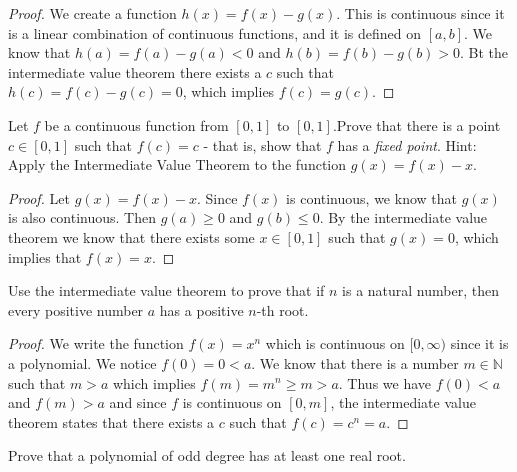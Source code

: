 \documentclass[12pt]{book}
\newcommand{\N}{\mathbb{N}}
\newenvironment{exercise}[2][Exercise]{\begin{trivlist}
\item[\hskip \labelsep {\bfseries #1}\hskip \labelsep {\bfseries #2.}]}{\end{trivlist}}
\begin{document}
\begin{exercise}{1.4.6}
\begin{exercise}{3.2.8}
    \begin{proof}
    We create a function $h(x)=f(x)-g(x)$. This is continuous since it is a linear combination of continuous functions, and it is defined on $[a,b]$. We know that $h(a)=f(a)-g(a)<0$ and $h(b)=f(b)-g(b)>0$.  Bt the intermediate value theorem there exists a $c$ such that $h(c)=f(c)-g(c)=0$, which implies $f(c)=g(c)$.
    \end{proof}
\end{exercise}



\begin{exercise}{3.2.9}
Let $f$ be a continuous function from $[0,1]$ to $[0,1]$.Prove that there is a point $c \in [0,1]$ such that $f(c) = c$ - that is, show that $f$ has a \emph{fixed point}. Hint: Apply the Intermediate Value Theorem to the function $g(x) = f(x)-x$. 
	\begin{proof}
	Let $g(x) = f(x) -x$. Since $f(x)$ is continuous, we know that $g(x)$ is also continuous. Then $g(a) \geq 0$ and $g(b) \leq 0$. By the intermediate value theorem we know that there exists some $x \in [0,1]$ such that $g(x) = 0$, which implies that $f(x)=x$.
	\end{proof}
\end{exercise}


\begin{exercise}{3.2.10}
    Use the intermediate value theorem to prove that if $n$ is a natural number, then every positive number $a$ has a positive $n$-th root.
    
    \begin{proof}
    We write the function $f(x)=x^n$ which is continuous on $[0,\infty)$ since it is a polynomial. We notice $f(0)=0<a$. We know that there is a number $m\in \N$ such that $m>a$ which implies $f(m)=m^n \geq m > a$. Thus we have $f(0) < a$ and $f(m)>a$ and since $f$ is continuous on $[0,m]$, the intermediate value theorem states that there exists a $c$ such that $f(c)=c^n=a$.
    \end{proof}
\end{exercise}


\begin{exercise}{3.2.11}
Prove that a polynomial of odd degree has at least one real root. 


\end{exercise}
\end{exercise}
\end{document}

